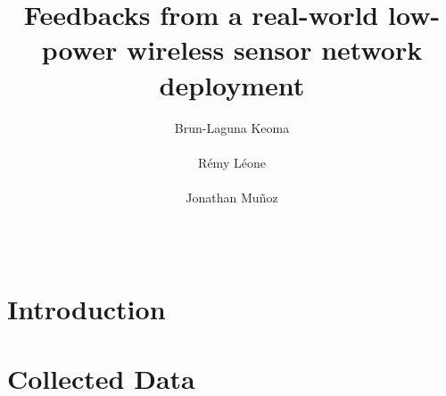 \documentclass[conference]{ACM}
\begin{document}
\title{Feedbacks from a real-world low-power wireless sensor network deployment}

\author{
  \alignauthor Brun-Laguna Keoma\\
    \\
  \alignauthor Rémy Léone\\
    \\
  \alignauthor Jonathan Muñoz\\
    \\
    \\
}

\maketitle

\begin{abstract}
\end{abstract}


\section{Introduction}
\label{sec:intro}





\section{Collected Data}
\label{sec:collected}








\end{document}
